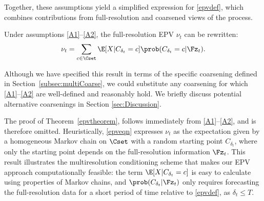 \documentclass[EPV_JASA.tex]{subfiles}
\begin{document}
Together, these assumptions yield a simplified expression for \eqref{epvdef}, which combines contributions from full-resolution and coarsened views of the process.
\begin{theorem}\label{epvtheorem}
    Under assumptions \ref{A1}--\ref{A2}, the full-resolution EPV $\nu_t$ can be rewritten:
\begin{equation}\label{epveqn}
\nu_t = \sum_{c \in \Cset} \E[X | C_{\delta_t} = c]\prob(C_{\delta_t} = c | \Fz_t).
\end{equation}
\end{theorem}
\begin{remark}
Although we have specified this result in terms of the specific coarsening defined in Section~\ref{subsec:multiCoarse}, we could substitute any coarsening for which \ref{A1}--\ref{A2} are well-defined and reasonably hold. We briefly discuss potential alternative coarsenings in Section \ref{sec:Discussion}.
\end{remark}
The proof of Theorem~\ref{epvtheorem}, follows immediately from \ref{A1}--\ref{A2}, and is therefore omitted. Heuristically, \eqref{epveqn} expresses $\nu_t$ as the expectation given by a homogeneous Markov chain on $\Cset$ with a random starting point $C_{\delta_t}$, where only the starting point depends on the full-resolution information $\Fz_t$. This result illustrates the multiresolution conditioning scheme that makes our EPV approach computationally feasible: the term $\E[X | C_{\delta_t} = c]$ is easy to calculate using properties of Markov chains, and $\prob(C_{\delta_t} | \Fz_t)$ only requires forecasting the full-resolution data for a short period of time relative to \eqref{epvdef}, as $\delta_t \leq T$.
\end{document}
